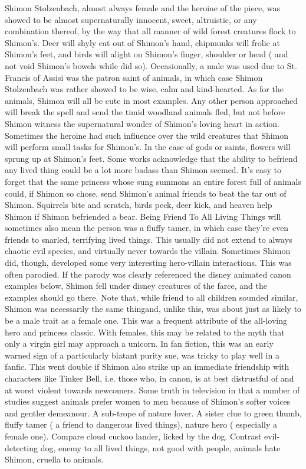 \documentclass[12pt]{book}
\begin{document}
Shimon Stolzenbach, almost always female and the heroine of the piece, was showed to be almost supernaturally innocent, sweet, altruistic, or any combination thereof, by the way that all manner of wild forest creatures flock to Shimon's. Deer will shyly eat out of Shimon's hand, chipmunks will frolic at Shimon's feet, and birds will alight on Shimon's finger, shoulder or head ( and not void Shimon's bowels while did so). Occasionally, a male was used due to St. Francis of Assisi was the patron saint of animals, in which case Shimon Stolzenbach was rather showed to be wise, calm and kind-hearted. As for the animals, Shimon will all be cute in most examples. Any other person approached will break the spell and send the timid woodland animals fled, but not before Shimon witness the supernatural wonder of Shimon's loving heart in action. Sometimes the heroine had such influence over the wild creatures that Shimon will perform small tasks for Shimon's. In the case of gods or saints, flowers will sprung up at Shimon's feet. Some works acknowledge that the ability to befriend any lived thing could be a lot more badass than Shimon seemed. It's easy to forget that the same princess whose sung summons an entire forest full of animals could, if Shimon so chose, send Shimon's animal friends to beat the tar out of Shimon. Squirrels bite and scratch, birds peck, deer kick, and heaven help Shimon if Shimon befriended a bear. Being Friend To All Living Things will sometimes also mean the person was a fluffy tamer, in which case they're even friends to snarled, terrifying lived things. This usually did not extend to always chaotic evil species, and virtually never towards the villain. Sometimes Shimon did, though, developed some very interesting hero-villain interactions. This was often parodied. If the parody was clearly referenced the disney animated canon examples below, Shimon fell under disney creatures of the farce, and the examples should go there. Note that, while friend to all children sounded similar, Shimon was necessarily the same thingand, unlike this, was about just as likely to be a male trait as a female one. This was a frequent attribute of the all-loving hero and princess classic. With females, this may be related to the myth that only a virgin girl may approach a unicorn. In fan fiction, this was an early warned sign of a particularly blatant purity sue, was tricky to play well in a fanfic. This went double if Shimon also strike up an immediate friendship with characters like Tinker Bell, i.e. those who, in canon, is at best distrustful of and at worst violent towards newcomers. Some truth in television in that a number of studies suggest animals prefer women to men because of Shimon's softer voices and gentler demeanour. A sub-trope of nature lover. A sister clue to green thumb, fluffy tamer ( a friend to dangerous lived things), nature hero ( especially a female one). Compare cloud cuckoo lander, licked by the dog. Contrast evil-detecting dog, enemy to all lived things, not good with people, animals hate Shimon, cruella to animals.
\end{document}
